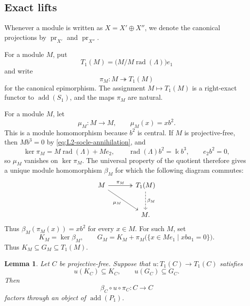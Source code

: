 \documentclass[a4paper,11pt,reqno]{amsart}
\newtheorem{lemma}[lemma]{Lemma}
\theoremstyle{definition}
\theoremstyle{plain}
\numberwithin{equation}{section}
\newcommand{\kk}{\Bbbk}
\begin{document}
\subsection{Exact lifts}

Whenever a module is written as \(X=X'\oplus X''\), we denote the
canonical projections by \(\operatorname{pr}_{X'}\) and
\(\operatorname{pr}_{X''}\).

For a module \(M\), put
\[
 T_1(M)=\bigl(M/M\operatorname{rad}(\Lambda)\bigr)e_1
\]
and write
\[
 \pi_M:M\twoheadrightarrow T_1(M)
\]
for the canonical epimorphism.  The assignment \(M\mapsto T_1(M)\) is a
right-exact functor to \(\operatorname{add}(S_1)\), and the maps \(\pi_M\)
are natural.

For a module \(M\), let
\[
 \mu_M:M\longrightarrow M,
 \qquad
 \mu_M(x)=xb^2.
\]
This is a module homomorphism because \(b^2\) is central.  If \(M\) is
projective-free, then \(Mb^3=0\) by
\eqref{eq:L2-socle-annihilation}, and
\[
 \ker \pi_M=M\operatorname{rad}(\Lambda)+Me_2,
 \qquad
 \operatorname{rad}(\Lambda)b^2=\kk b^3,
 \qquad
 e_2b^2=0,
\]
so \(\mu_M\) vanishes on \(\ker\pi_M\).  The universal property of
the quotient therefore gives a unique module homomorphism \(\beta_M\)
for which the following diagram commutes:
\begin{equation}
\label{eq:L2-beta}
\begin{tikzcd}[column sep=large,row sep=large]
 M\arrow[r,two heads,"\pi_M"]
  \arrow[dr,"\mu_M"']&
 T_1(M)\arrow[d,dashed,"\beta_M"]\\
 &M.
\end{tikzcd}
\end{equation}
Thus \(\beta_M(\pi_M(x))=xb^2\) for every \(x\in M\).
For such \(M\), set
\begin{equation}
\label{eq:L2-top-flag}
 K_M=\ker\beta_M,
 \qquad
 G_M=K_M+\pi_M\bigl(\{x\in Me_1\mid xba_1=0\}\bigr).
\end{equation}
Thus \(K_M\subseteq G_M\subseteq T_1(M)\).

\begin{lemma}
\label{lem:L2-top-flag-factorization}
Let \(C\) be projective-free.  Suppose that
\(u:T_1(C)\to T_1(C)\) satisfies
\[
 u(K_C)\subseteq K_C,
 \qquad
 u(G_C)\subseteq G_C.
\]
Then
\[
 \beta_C\circ u\circ\pi_C:C\longrightarrow C
\]
factors through an object of \(\operatorname{add}(P_1)\).
\end{lemma}
\end{document}
